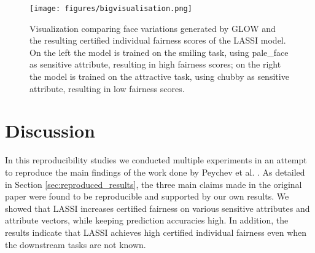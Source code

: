 

\begin{figure}[H]
    \hspace*{-2.1cm}
    \texttt{[image: figures/bigvisualisation.png]}
    \caption{Visualization comparing face variations generated by GLOW and the resulting certified individual fairness scores of the LASSI model. On the left the model is trained on the smiling task, using pale\_face as sensitive attribute, resulting in high fairness scores; on the right the model is trained on the attractive task, using chubby as sensitive attribute, resulting in low fairness scores.}
    \label{fig:chubby_attractive}
\end{figure}

\section{Discussion}\label{sec:discussion}
In this reproducibility studies we conducted multiple experiments in an attempt to reproduce the main findings of the work done by Peychev et al. \cite{peychev2022latent}. As detailed in Section \ref{sec:reproduced_results}, the three main claims made in the original paper were found to be reproducible and supported by our own results. We showed that LASSI increases certified fairness on various sensitive attributes and attribute vectors, while keeping prediction accuracies high. In addition, the results indicate that LASSI achieves high certified individual fairness even when the downstream tasks are not known. 

